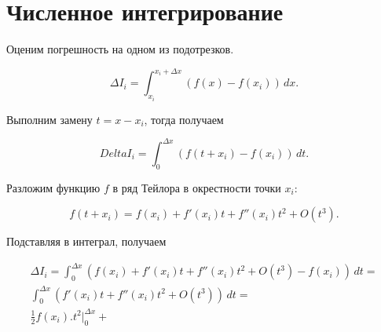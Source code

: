 \section{Численное интегрирование}


Оценим погрешность на одном из подотрезков.

\[
\Delta I_i = \int_{x_i}^{x_i+\Delta x} (f(x) - f(x_i))\,dx.
\]

Выполним замену $t = x - x_i$, тогда получаем

\[
Delta I_i = \int_0^{\Delta x} (f(t + x_i) - f(x_i))\, dt.
\]

Разложим функцию $f$ в ряд Тейлора в окрестности точки $x_i$:

\[
    f(t + x_i) = f(x_i) + f'(x_i)t + f''(x_i)t^2 + O(t^3).
\]

Подставляя в интеграл, получаем

\begin{multline*}
\Delta I_i = \int_0^{\Delta x} (f(x_i) + f'(x_i)t + f''(x_i)t^2 + O(t^3) - f(x_i))\,dt =\\
\int_0^{\Delta x}(f'(x_i)t + f''(x_i)t^2 + O(t^3))\,dt=\\
\frac12 f(x_i) \bigl. t^2 \bigr|_{0}^{\Delta x} + 
\end{multline*}
